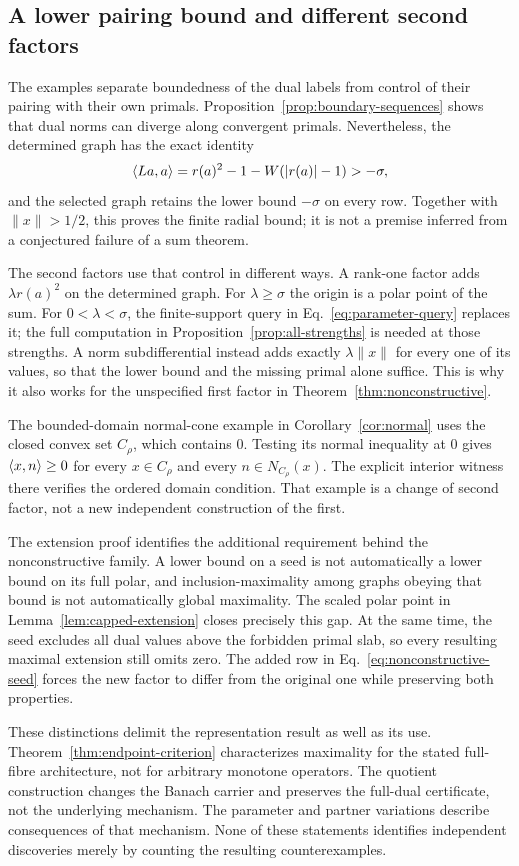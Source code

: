 \subsection{A lower pairing bound and different second factors}
The examples separate boundedness of the dual labels from control of
their pairing with their own primals. Proposition~\ref{prop:boundary-sequences}
shows that dual norms can diverge along convergent primals. Nevertheless,
the determined graph has the exact identity
\[
\langle La,a\rangle=r(a)^2-1-W(|r(a)|-1)>-\sigma,
\]
and the selected graph retains the lower bound $-\sigma$ on every row.
Together with $\|x\|>1/2$, this proves the finite radial bound; it is
not a premise inferred from a conjectured failure of a sum theorem.

The second factors use that control in different ways. A rank-one factor
adds $\lambda r(a)^2$ on the determined graph. For $\lambda\ge\sigma$
the origin is a polar point of the sum. For $0<\lambda<\sigma$, the
finite-support query in Eq.~\eqref{eq:parameter-query} replaces it;
the full computation in Proposition~\ref{prop:all-strengths} is needed
at those strengths. A norm subdifferential instead adds exactly
$\lambda\|x\|$ for every one of its values, so that the lower bound
and the missing primal alone suffice. This is why it also works for
the unspecified first factor in Theorem~\ref{thm:nonconstructive}.

The bounded-domain normal-cone example in Corollary~\ref{cor:normal}
uses the closed convex set $C_\rho$, which contains $0$. Testing its
normal inequality at $0$ gives $\langle x,n\rangle\ge0$ for every
$x\in C_\rho$ and every $n\in N_{C_\rho}(x)$. The explicit interior
witness there verifies the ordered domain condition. That example is a change
of second factor, not a new independent construction of the first.


The extension proof identifies the additional requirement behind the
nonconstructive family. A lower bound on a seed is not automatically a
lower bound on its full polar, and inclusion-maximality among graphs
obeying that bound is not automatically global maximality. The scaled
polar point in Lemma~\ref{lem:capped-extension} closes precisely this
gap. At the same time, the seed excludes all dual values above the
forbidden primal slab, so every resulting maximal extension still omits
zero. The added row in Eq.~\eqref{eq:nonconstructive-seed} forces the
new factor to differ from the original one while preserving both
properties.

These distinctions delimit the representation result as well as its
use. Theorem~\ref{thm:endpoint-criterion} characterizes maximality for
the stated full-fibre architecture, not for arbitrary monotone operators.
The quotient construction changes the Banach carrier and preserves the
full-dual certificate, not the underlying mechanism. The parameter and
partner variations describe consequences of that mechanism. None of
these statements identifies independent discoveries merely by counting
the resulting counterexamples.




